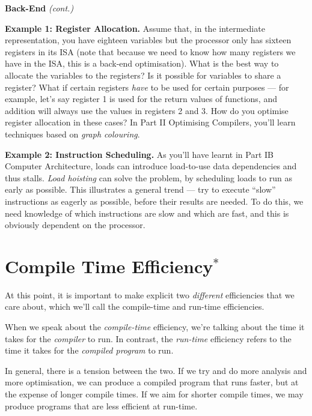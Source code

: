 \begin{minipage}[t]{0.15\textwidth}
\textbf{\sffamily Back-End} \textit{\sffamily (cont.)}    
\end{minipage}%
\begin{minipage}[t]{0.85\textwidth}
    \setlength{\parskip}{.5\baselineskip}
    \textbf{Example 1: Register Allocation.} Assume that, in the intermediate representation, you have eighteen variables but the processor only has sixteen registers in its ISA (note that because we need to know how many registers we have in the ISA, this is a back-end optimisation). What is the best way to allocate the variables to the registers? Is it possible for variables to share a register? What if certain registers \emph{have} to be used for certain purposes --- for example, let's say register 1 is used for the return values of functions, and addition will always use the values in registers 2 and 3. How do you optimise register allocation in these cases? In {\sffamily Part II Optimising Compilers}, you'll learn techniques based on \emph{graph colouring}.
    
    \textbf{Example 2: Instruction Scheduling.} As you'll have learnt in {\sffamily Part IB Computer Architecture}, loads can introduce load-to-use data dependencies and thus stalls. \textit{Load hoisting} can solve the problem, by scheduling loads to run as early as possible. This illustrates a general trend --- try to execute ``slow'' instructions as eagerly as possible, before their results are needed. To do this, we need knowledge of which instructions are slow and which are fast, and this is obviously dependent on the processor.
\end{minipage}

\section{Compile Time Efficiency$^{*}$}
At this point, it is important to make explicit two \emph{different} efficiencies that we care about, which we'll call the compile-time and run-time efficiencies.

When we speak about the \emph{compile-time} efficiency, we're talking about the time it takes for the \emph{compiler} to run. In contrast, the \emph{run-time} efficiency refers to the time it takes for the \emph{compiled program} to run.

In general, there is a tension between the two. If we try and do more analysis and more optimisation, we can produce a compiled program that runs faster, but at the expense of longer compile times. If we aim for shorter compile times, we may produce programs that are less efficient at run-time.

